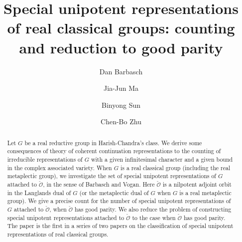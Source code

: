 \documentclass[12pt,a4paper]{amsart}
\newcommand{\CO}{{\mathcal {O}}}
\numberwithin{equation}{section}
\theoremstyle{remark}
\begin{document}
\title[Special unipotent representations]{Special unipotent representations of real classical groups: counting and reduction to good parity}

\author [D. Barbasch] {Dan Barbasch}
\address{Department of Mathematics\\
  310 Malott Hall, Cornell University, Ithaca, New York 14853 }

\author [J.-J. Ma] {Jia-Jun Ma}
\address{School of Mathematical Sciences\\
  Xiamen University\\
  Xiamen, China} 

\author [B. Sun] {Binyong Sun}
\address{Institute for Advanced Study in Mathematics\\
 Zhejiang University\\
  Hangzhou, China} 


\author [C.-B. Zhu] {Chen-Bo Zhu}
\address{Department of Mathematics\\
  National University of Singapore\\
  10 Lower Kent Ridge Road, Singapore 119076} 




 


\begin{abstract} Let $G$ be a real reductive group in Harish-Chandra's class. We derive some consequences of theory of coherent continuation representations
 to the counting of irreducible representations of $G$ with a given infinitesimal character and a given bound in the complex associated variety. When $G$ is a real classical group (including the real metaplectic group), we investigate the set of special unipotent representations of $G$ attached to $\check \CO$, in the sense of Barbasch and Vogan. Here $\check \CO$ is a nilpotent adjoint orbit in the Langlands dual of $G$ (or the metaplectic dual of $G$ when $G$ is a real metaplectic group). We give a precise count for the number of special unipotent representations of $G$ attached to $\check \CO$, when $\check \CO$ has good parity. We also reduce the problem of constructing special unipotent representations attached to $\check \CO$ to the case when $\check \CO$ has good parity. The paper is the first in a series of two papers on the classification of special unipotent representations of real classical groups.
\end{abstract}
\end{document}
